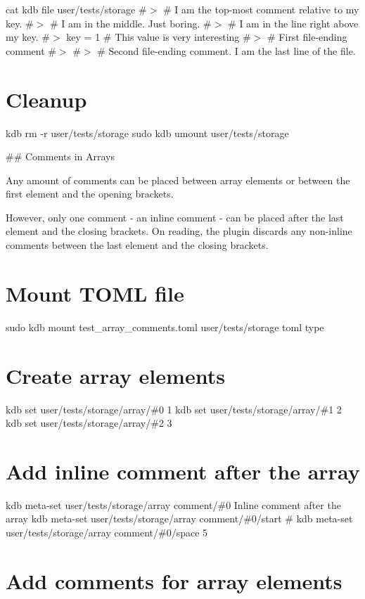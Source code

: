 cat {\ttfamily kdb file user/tests/storage} \#$>$ \# I am the top-\/most comment relative to my key. \#$>$ \# I am in the middle. Just boring. \#$>$ \# I am in the line right above my key. \#$>$ key = 1 \# This value is very interesting \#$>$ \# First file-\/ending comment \#$>$ \#$>$ \# Second file-\/ending comment. I am the last line of the file.\hypertarget{autotoc_md693_autotoc_md784}{}\section{Cleanup}\label{autotoc_md693_autotoc_md784}
kdb rm -\/r user/tests/storage sudo kdb umount user/tests/storage 
\begin{DoxyCode}
## Comments in Arrays

Any amount of comments can be placed between array elements or between the first element and the opening
       brackets.

However, only one comment - an inline comment - can be placed after the last element and the closing
       brackets.
On reading, the plugin discards any non-inline comments between the last element and the closing brackets.
\end{DoxyCode}
 \hypertarget{autotoc_md693_autotoc_md785}{}\section{Mount T\+O\+M\+L file}\label{autotoc_md693_autotoc_md785}
sudo kdb mount test\+\_\+array\+\_\+comments.\+toml user/tests/storage toml type\hypertarget{autotoc_md693_autotoc_md786}{}\section{Create array elements}\label{autotoc_md693_autotoc_md786}
kdb set \textquotesingle{}user/tests/storage/array/\#0\textquotesingle{} \textquotesingle{}1\textquotesingle{} kdb set \textquotesingle{}user/tests/storage/array/\#1\textquotesingle{} \textquotesingle{}2\textquotesingle{} kdb set \textquotesingle{}user/tests/storage/array/\#2\textquotesingle{} \textquotesingle{}3\textquotesingle{}\hypertarget{autotoc_md693_autotoc_md787}{}\section{Add inline comment after the array}\label{autotoc_md693_autotoc_md787}
kdb meta-\/set \textquotesingle{}user/tests/storage/array\textquotesingle{} \textquotesingle{}comment/\#0\textquotesingle{} \textquotesingle{} Inline comment after the array\textquotesingle{} kdb meta-\/set \textquotesingle{}user/tests/storage/array\textquotesingle{} \textquotesingle{}comment/\#0/start\textquotesingle{} \textquotesingle{}\#\textquotesingle{} kdb meta-\/set \textquotesingle{}user/tests/storage/array\textquotesingle{} \textquotesingle{}comment/\#0/space\textquotesingle{} \textquotesingle{}5\textquotesingle{}\hypertarget{autotoc_md693_autotoc_md788}{}\section{Add comments for array elements}\label{autotoc_md693_autotoc_md788}

